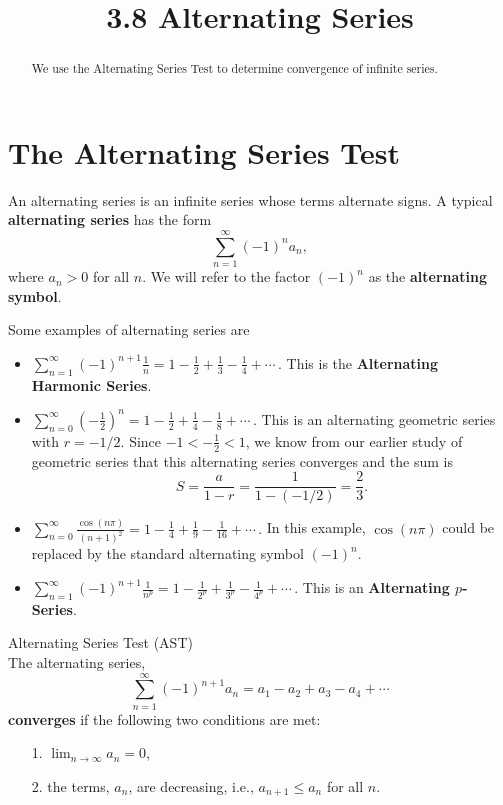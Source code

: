\documentclass[handout]{ximera}
\title{3.8 Alternating Series}
\begin{document}
\begin{abstract}
We use the Alternating Series Test to determine convergence of infinite series.
\end{abstract}

\maketitle


\section{The Alternating Series Test}

An alternating series is an infinite series whose terms alternate signs.
A typical \textbf{alternating series} has the form 
\[
\sum_{n=1}^\infty (-1)^n a_n,
\]
where $a_n > 0$ for all $n$. We will refer to the factor $(-1)^n$ as the \textbf{alternating symbol}.

Some examples of alternating series are
\begin{itemize}

\item $\displaystyle{\sum_{n=1}^\infty (-1)^{n+1} \frac{1}{n} = 1 - \frac12 + \frac13 - \frac14 + \cdots  }\, .$  This is the \textbf{Alternating Harmonic Series}.

\item $\displaystyle{\sum_{n=0}^\infty \left(-\frac12\right)^n = 1 - \frac12 + \frac14 - \frac18 + \cdots }\, .$  This is an alternating geometric series with $r=-1/2$.
Since $-1 < -\frac12 < 1$, we know from our earlier study of geometric series that this alternating series converges and 
the sum is 
\[
S = \frac{a}{1-r} = \frac{1}{1-(-1/2)} = \frac23.
\]

\item $\displaystyle{\sum_{n=0}^\infty \frac{\cos(n\pi)}{(n+1)^2} = 1 - \frac14 + \frac19 - \frac{1}{16} + \cdots}\, .$ 
In this example, $\cos(n\pi)$ could be replaced by the standard alternating symbol $(-1)^n$.


\item $\displaystyle{\sum_{n=1}^\infty (-1)^{n+1} \frac{1}{n^p} = 1 - \frac{1}{2^p} + \frac{1}{3^p} - \frac{1}{4^p} + \cdots  }\, .$  This is an \textbf{Alternating $p$-Series}.


\end{itemize}

\begin{theorem} Alternating Series Test (AST)\\
The alternating series, 
\[
\sum_{n=1}^\infty (-1)^{n+1} a_n = a_1 - a_2 + a_3 - a_4 + \cdots
\]
\textbf{converges} if the following two conditions are met:
\begin{itemize}
\item[1.] $\displaystyle{\lim_{n\to\infty} a_n = 0}$,
\item[2.] the terms, $a_n$, are decreasing, i.e., $a_{n+1} \leq a_n$ for all $n$.
\end{itemize}
\end{theorem}
\end{document}
